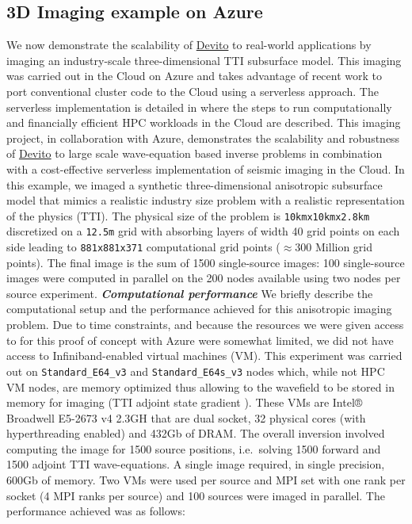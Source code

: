 \documentclass[10pt, conference]{IEEEtran}
\newcommand{\devito}{\href{https://github.com/devitocodes/devito}{Devito} }
\begin{document}
\subsection{3D Imaging example on Azure}\label{d-imaging-example-on-azure}

We now demonstrate the scalability of \devito to real-world applications by
imaging an industry-scale three-dimensional TTI subsurface model. This
imaging was carried out in the Cloud on Azure and takes advantage of
recent work to port conventional cluster code to the Cloud using a
serverless approach. The serverless implementation is detailed in
\cite{witte2019TPDedas, witte2019SEGedw} where the steps to run
computationally and financially efficient HPC workloads in the Cloud are
described. This imaging project, in collaboration with Azure, demonstrates
the scalability and robustness of \devito to large scale wave-equation
based inverse problems in combination with a cost-effective serverless
implementation of seismic imaging in the Cloud. In this example, we imaged
a synthetic three-dimensional anisotropic subsurface model that mimics a
realistic industry size problem with a realistic representation of the
physics (TTI). The physical size of the problem is
\texttt{10kmx10kmx2.8km} discretized on a \texttt{12.5m} grid with
absorbing layers of width 40 grid points on each side leading to
\texttt{881x881x371} computational grid points ($\approx300$ Million grid
points). The final image is the sum of 1500 single-source images: 100
single-source images were computed in parallel on the 200 nodes available
using two nodes per source experiment.
\vskip 0.1in
\noindent
\textbf{\emph{Computational performance}}
\vskip 0.1in
We briefly describe the computational setup and the performance achieved
for this anisotropic imaging problem. Due to time constraints, and because
the resources we were given access to for this proof of concept with Azure
were somewhat limited, we did not have access to Infiniband-enabled
virtual machines (VM). This experiment was carried out on
\texttt{Standard\_E64\_v3} and \texttt{Standard\_E64s\_v3} nodes which,
while not HPC VM nodes, are memory optimized thus allowing to the
wavefield to be stored in memory for imaging (TTI adjoint state gradient
\cite{virieux, louboutin2018segeow}). These VMs are Intel® Broadwell
E5-2673 v4 2.3GH that are dual socket, 32 physical cores (with
hyperthreading enabled) and 432Gb of DRAM.  The overall inversion involved
computing the image for 1500 source positions, i.e.~solving 1500 forward
and 1500 adjoint TTI wave-equations. A single image required, in single
precision, 600Gb of memory. Two VMs were used per source and MPI set with
one rank per socket (4 MPI ranks per source) and 100 sources were imaged
in parallel. The performance achieved was as follows:
\end{document}
